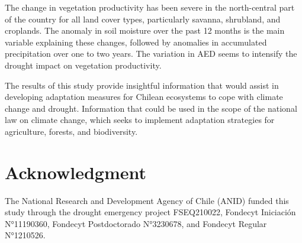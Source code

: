 \documentclass[
  authoryear,
  preprint,
  3p,
  onecolumn]{elsarticle}
\begin{document}
The change in vegetation productivity has been severe in the
north-central part of the country for all land cover types, particularly
savanna, shrubland, and croplands. The anomaly in soil moisture over the
past 12 months is the main variable explaining these changes, followed
by anomalies in accumulated precipitation over one to two years. The
variation in AED seems to intensify the drought impact on vegetation
productivity.

The results of this study provide insightful information that would
assist in developing adaptation measures for Chilean ecosystems to cope
with climate change and drought. Information that could be used in the
scope of the national law on climate change, which seeks to implement
adaptation strategies for agriculture, forests, and biodiversity.

\hypertarget{acknowledgment}{%
\section{Acknowledgment}\label{acknowledgment}}

The National Research and Development Agency of Chile (ANID) funded this
study through the drought emergency project FSEQ210022, Fondecyt
Iniciación N°11190360, Fondecyt Postdoctorado N°3230678, and Fondecyt
Regular N°1210526.


\renewcommand\refname{References}
  
\end{document}
